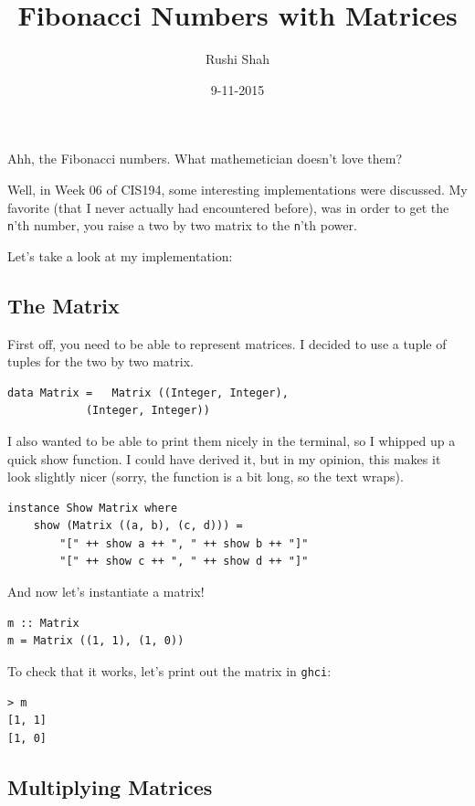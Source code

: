 \documentclass[12pt]{article}
\title{Fibonacci Numbers with Matrices}
\author{Rushi Shah}
\date{9-11-2015}
\begin{document}
	\maketitle
	Ahh, the Fibonacci numbers. What mathemetician doesn't love them?

	Well, in Week 06 of CIS194, some interesting implementations were
	discussed. My favorite (that I never actually had encountered before),
	was in order to get the \texttt{n}'th number, you raise a two by two
	matrix to the \texttt{n}'th power.

	Let's take a look at my implementation:

	\subsection{The Matrix}\label{the-matrix}

	First off, you need to be able to represent matrices. I decided to use a
	tuple of tuples for the two by two matrix.

	\begin{lstlisting}
data Matrix = 	Matrix ((Integer, Integer),
			(Integer, Integer)) 
	\end{lstlisting}

	I also wanted to be able to print them nicely in the terminal, so I
	whipped up a quick show function. I could have derived it, but in my
	opinion, this makes it look slightly nicer (sorry, the function is a bit
	long, so the text wraps).

	\begin{lstlisting}
instance Show Matrix where 
	show (Matrix ((a, b), (c, d))) = 
		"[" ++ show a ++ ", " ++ show b ++ "]"
		"[" ++ show c ++ ", " ++ show d ++ "]"
	\end{lstlisting}

	And now let's instantiate a matrix!

	\begin{lstlisting}
m :: Matrix 
m = Matrix ((1, 1), (1, 0)) 
	\end{lstlisting}

	To check that it works, let's print out the matrix in \texttt{ghci}:

	\begin{lstlisting}
> m
[1, 1]
[1, 0] 
	\end{lstlisting}

	\subsection{Multiplying Matrices}\label{multiplying-matrices}
\end{document}
